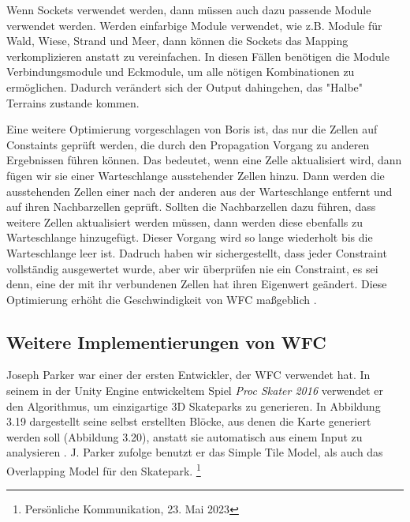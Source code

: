 \documentclass[12pt, a4paper,twoside,openany]{report} %
\begin{document}
Wenn Sockets verwendet werden, dann müssen auch dazu passende Module verwendet werden.
Werden einfarbige Module verwendet, wie z.B. Module für Wald, Wiese, Strand und Meer,
dann können die Sockets das Mapping verkomplizieren anstatt zu vereinfachen.
In diesen Fällen benötigen die Module Verbindungsmodule und Eckmodule, um alle nötigen Kombinationen zu ermöglichen.
Dadurch verändert sich der Output dahingehen, das "Halbe" Terrains zustande kommen.

Eine weitere Optimierung vorgeschlagen von Boris ist, das nur die Zellen auf Constaints geprüft werden,
die durch den Propagation Vorgang zu anderen Ergebnissen führen können.
Das bedeutet, wenn eine Zelle aktualisiert wird, dann fügen wir sie einer Warteschlange ausstehender Zellen hinzu.
Dann werden die ausstehenden Zellen einer nach der anderen aus der Warteschlange entfernt und auf ihren Nachbarzellen geprüft.
Sollten die Nachbarzellen dazu führen, dass weitere Zellen aktualisiert werden müssen, dann werden diese ebenfalls zu Warteschlange hinzugefügt.
Dieser Vorgang wird so lange wiederholt bis die Warteschlange leer ist.
Dadruch haben wir sichergestellt,
dass jeder Constraint vollständig ausgewertet wurde, aber wir überprüfen nie ein Constraint,
es sei denn, eine der mit ihr verbundenen Zellen hat ihren Eigenwert geändert.
Diese Optimierung erhöht die Geschwindigkeit von WFC maßgeblich \cite{boris}.

\pagebreak
\subsection{Weitere Implementierungen von WFC}

Joseph Parker war einer der ersten Entwickler, der WFC verwendet hat.
In seinem in der Unity Engine entwickeltem Spiel \textit{Proc Skater 2016} verwendet er den Algorithmus, um einzigartige 3D Skateparks zu generieren.
In Abbildung 3.19 dargestellt seine selbst erstellten Blöcke, aus denen die Karte generiert werden soll {(Abbildung 3.20)}, anstatt sie automatisch aus einem Input zu analysieren \cite{procskater2016}.
J. Parker zufolge benutzt er das Simple Tile Model, als auch das Overlapping Model für den Skatepark. \footnote[5]{Persönliche Kommunikation, 23. Mai 2023}
\end{document}
